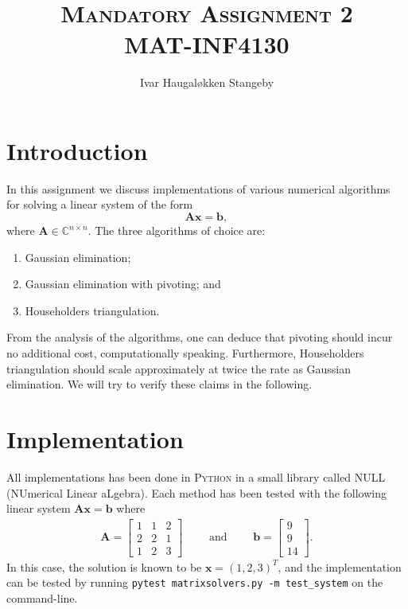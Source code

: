 \documentclass[oneside, a4paper, 12pt, article]{memoir}
\title{\textsc{Mandatory Assignment 2} \\ \textsc{MAT-INF4130}}
\author{Ivar Haugal{\o}kken Stangeby}
\newcommand{\mat}[1]{\boldsymbol{#1}}
\newcommand{\Python}{\textsc{Python} }
\begin{document}
    \maketitle     
    
    \chapter{Introduction}

    In this assignment we discuss implementations of various numerical
    algorithms for solving a linear system of the form 
    \begin{equation} 
        \mat{A} \mat{x} = \mat{b}, 
    \end{equation}
    where \( \mat{A} \in \mathbb{C}^{n\times n} \). The three algorithms of
    choice are:
    \begin{enumerate}
        \item Gaussian elimination;
        \item Gaussian elimination with pivoting; and
        \item Householders triangulation.
    \end{enumerate}
    From the analysis of the algorithms, one can deduce that pivoting should
    incur no additional cost, computationally speaking. Furthermore,
    Householders triangulation should scale approximately at twice the rate as
    Gaussian elimination. We will try to verify these claims in the following.
    
    \chapter{Implementation}
    
    All implementations has been done in \Python in a small library called
    \textsc{NULL} (NUmerical Linear aLgebra). Each method has been tested with
    the following linear system \( \mat{A}\mat{x} = \mat{b} \) where 
    \begin{align}
        \mat{A} = \begin{bmatrix}
            1 & 1 & 2 \\
            2 & 2 & 1 \\
            1 & 2 & 3 
        \end{bmatrix} \qquad \text{ and } \qquad
        \mat{b} = \begin{bmatrix}
            9 \\
            9 \\
            14
        \end{bmatrix}.
    \end{align} 
    In this case, the solution is known to be \( \mat{x} = (1, 2, 3)^T \), and
    the implementation can be tested by running \texttt{pytest matrixsolvers.py
    -m test\_system} on the command-line.
   
\end{document}
